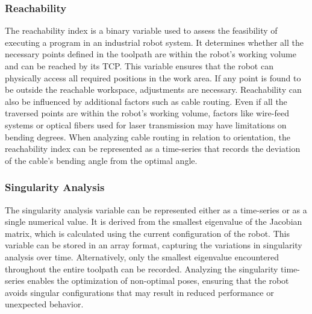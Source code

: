 \subsubsection*{Reachability}
The reachability index is a binary variable used to assess the feasibility of executing a program in an industrial robot system. It determines whether all the necessary points defined in the toolpath are within the robot's working volume and can be reached by its \acrshort{TCP}. This variable ensures that the robot can physically access all required positions in the work area. If any point is found to be outside the reachable workspace, adjustments are necessary. Reachability can also be influenced by additional factors such as cable routing. Even if all the traversed points are within the robot's working volume, factors like wire-feed systems or optical fibers used for laser transmission may have limitations on bending degrees. When analyzing cable routing in relation to orientation, the reachability index can be represented as a time-series that records the deviation of the cable's bending angle from the optimal angle.

\subsubsection*{Singularity Analysis}
The singularity analysis variable can be represented either as a time-series or as a single numerical value. It is derived from the smallest eigenvalue of the Jacobian matrix, which is calculated using the current configuration of the robot. This variable can be stored in an array format, capturing the variations in singularity analysis over time. Alternatively, only the smallest eigenvalue encountered throughout the entire toolpath can be recorded. Analyzing the singularity time-series enables the optimization of non-optimal poses, ensuring that the robot avoids singular configurations that may result in reduced performance or unexpected behavior.



